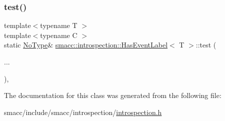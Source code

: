 \subsubsection{\texorpdfstring{test()}{test()}\hspace{0.1cm}{\footnotesize\ttfamily [2/2]}}
{\footnotesize\ttfamily template$<$typename T $>$ \\
template$<$typename C $>$ \\
static \hyperlink{classsmacc_1_1introspection_1_1HasEventLabel_a91b6dd8a7c59c7f24ef0937c99026e81}{No\+Type}\& \hyperlink{classsmacc_1_1introspection_1_1HasEventLabel}{smacc\+::introspection\+::\+Has\+Event\+Label}$<$ T $>$\+::test (\begin{DoxyParamCaption}\item[{}]{... }\end{DoxyParamCaption})\hspace{0.3cm}{\ttfamily [static]}, {\ttfamily [private]}}



The documentation for this class was generated from the following file\+:\begin{DoxyCompactItemize}
\item 
smacc/include/smacc/introspection/\hyperlink{introspection_8h}{introspection.\+h}\end{DoxyCompactItemize}
